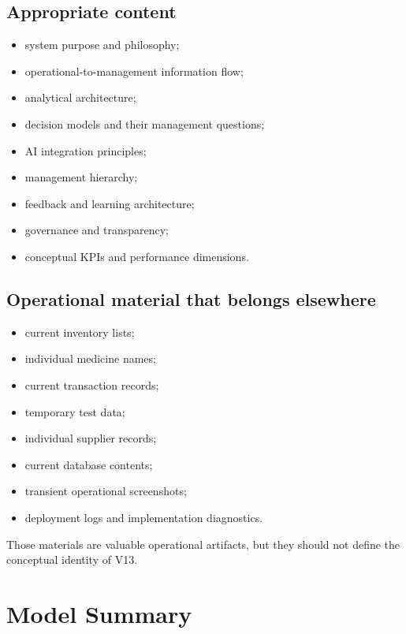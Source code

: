 \documentclass[11pt,a4paper]{article}
\begin{document}
\subsection*{Appropriate content}

\begin{itemize}
\item system purpose and philosophy;
\item operational-to-management information flow;
\item analytical architecture;
\item decision models and their management questions;
\item AI integration principles;
\item management hierarchy;
\item feedback and learning architecture;
\item governance and transparency;
\item conceptual KPIs and performance dimensions.
\end{itemize}

\subsection*{Operational material that belongs elsewhere}

\begin{itemize}
\item current inventory lists;
\item individual medicine names;
\item current transaction records;
\item temporary test data;
\item individual supplier records;
\item current database contents;
\item transient operational screenshots;
\item deployment logs and implementation diagnostics.
\end{itemize}

Those materials are valuable operational artifacts, but they should not define
the conceptual identity of V13.

\section{Model Summary}
\end{document}
